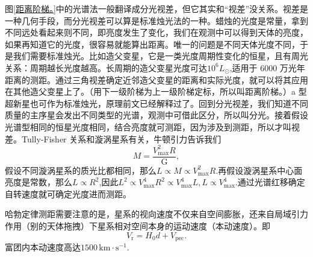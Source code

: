 \documentclass[../天体物理基础.tex]{subfiles}
\begin{document}
图\ref{距离阶梯。}中的光谱法一般翻译成分光视差，但它其实和“视差”没关系。视差是一种几何手段，而分光视差可以算是标准烛光法的一种。蜡烛的光度是常量，拿到不同远处看起来则不同，即亮度发生了变化，我们在观测中可以得到天体的亮度，如果再知道它的光度，很容易就能算出距离。唯一的问题是不同天体光度不同，于是我们需要标准烛光。比如造父变星，它是一类光度周期性变化的恒星，且有周光关系：周期越长光度越高。长周期的造父变星光度可达$10^{6}L_{\odot}$,适用于 6000 万光年距离的测距。通过三角视差确定近邻造父变星的距离和实际光度，就可以将其应用在其他造父变星上了。（用下一级阶梯为上一级阶梯定标，所以叫距离阶梯。）\uppercase\expandafter{}a 型超新星也可作为标准烛光，原理前文已经解释过了。回到分光视差，我们知道不同质量的主序星会发出不同类型的光谱，观测中可借此区分，所以叫分光。接着假设光谱型相同的恒星光度相同，结合亮度就可测距，因为涉及到测距，所以才叫视差。Tully-Fisher 关系和漩涡星系有关，牛顿引力告诉我们
\begin{equation}
M=\frac{V_{\max}^{2}R}{\mathrm{G}},
\end{equation}
假设不同漩涡星系的质光比都相同，那么$L\propto{}M\propto{}V_{\text{max}}^{2}R$.再假设漩涡星系中心面亮度是常数，那么$L\propto{}R^{2}$,因此$L^{2}\propto{}V_{\max}^{4}R^{2}\propto{}V_{\max}^{4}L,L\propto{}V_{\max}^{4}$.通过光谱红移确定自转速度就可确定光度进而测距。

哈勃定律测距需要注意的是，星系的视向速度不仅来自空间膨胀，还来自局域引力作用（别的天体拖拽）下星系相对空间本身的运动速度（本动速度）。即
\begin{equation}
V_{\mathrm{r}}=H_{0}d+V_{\text{pec}}.
\end{equation}
富团内本动速度高达$1500\,\mathrm{km\cdot s^{-1}}$.
\printbibliography
\end{document}
